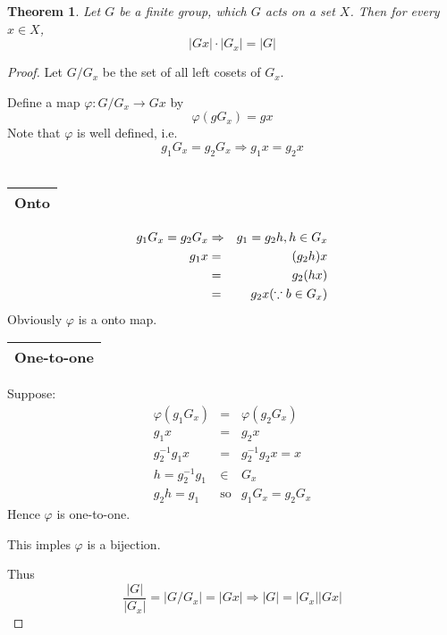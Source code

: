 \documentclass{article}
\theoremstyle{MyNonumberplain}
\theoremstyle{break}
\newtheorem*{proof}{Proof. }
\newcommand{\tmop}{\text}
\theoremstyle{break}
\newtheorem{theorem}{Theorem}[section]
\theoremstyle{break}
\theoremstyle{definition}
\theoremstyle{break}
\begin{document}
\begin{thmbox}
    \begin{theorem}
        Let $G$ be a finite group, which $G$ acts on a set $X$. Then for every $x \in
X$,
\[ | G x | \cdot | G_x | = | G | \]
    \end{theorem}
    \begin{prfbox}
        \begin{proof}
            Let $G / G_x$ be the set of all left cosets of $G_x$.\bigskip

            Define a map $\varphi : G / G_x \rightarrow G x$ by
            \[ \varphi (g G_x) = g x \]
            Note that $\varphi$ is well defined, i.e.
            \[ g_1 G_x = g_2 G_x \Rightarrow g_1 x = g_2 x \]\\
            \begin{tabular}{|c|}
            \hline
            Onto\\
            \hline
            \end{tabular}
            \begin{eqnarray*}
            g_1 G_x = g_2 G_x & \Rightarrow & g_1 = g_2 h, h \in G_x\\
            g_1 x & = & (g_2 h) x\\
            & = & g_2 (h x)\\
            & = & g_2 x \hspace*{\fill} (\because b \in G_x)
            \end{eqnarray*}
            Obviously $\varphi$ is a onto map.\bigskip

            \begin{tabular}{|c|}
            \hline
            One-to-one\\
            \hline
            \end{tabular}\bigskip

            Suppose:
            \begin{eqnarray*}
            \varphi (g_1 G_x) & = & \varphi (g_2 G_x)\\
            g_1 x & = & g_2 x\\
            g_2^{- 1} g_1 x & = & g^{- 1}_2 g_2 x = x\\
            h = g_2^{- 1} g_1 & \in & G_x\\
            g_2 h = g_1 & \tmop{so} & g_1 G_x = g_2 G_x
            \end{eqnarray*}
            Hence $\varphi$ is one-to-one.\bigskip

            This imples $\varphi$ is a bijection.\bigskip

            Thus
            \[ \frac{| G |}{| G_x |} = | G / G_x | = | G x | \Rightarrow | G | = | G_x |
            | G x | \]
        \end{proof}
    \end{prfbox}
\end{thmbox}
\end{document}
